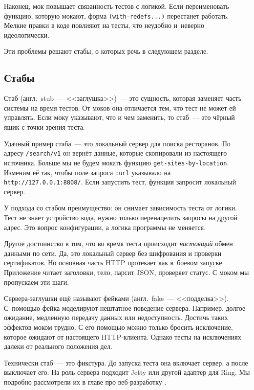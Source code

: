 Наконец, мок повышает связанность тестов с логикой. Если переименовать функцию,
которую мокают, форма \verb|(with-redefs...)| перестанет работать. Мелкие правки
в коде повлияют на тесты, что неудобно и~неверно идеологически.

Эти проблемы решают стабы, о которых речь в следующем разделе.

\subsection{Стабы}


Стаб (англ.~stub~--- <<заглушка>>)~--- это сущность, которая заменяет часть
системы на время тестов. От моков она отличается тем, что тест не может ей
управлять. Если моку указывают, что и чем заменить, то стаб~--- это чёрный ящик с
точки зрения теста.

Удачный пример стаба~--- это локальный сервер для поиска ресторанов. По адресу
\verb|/search/v1| он вернёт данные, которые скопировали из настоящего
источника. Больше мы не будем мокать функцию \verb|get-sites-by-location|.
Изменим её так, чтобы поле запроса \verb|:url| указывало на \verb|http://127.0.0.1:8808/|.
Если запустить тест, функция запросит локальный сервер.

У подхода со стабом преимущество: он снимает зависимость теста от логики. Тест
не знает устройство кода, нужно только перенацелить запросы на другой адрес. Это
вопрос конфигурации, а логика программы не меняется.

Другое достоинство в том, что во время теста происходит \emph{настоящий} обмен
данными по сети. Да, это локальный сервер без шифрования и проверки
сертификатов. Но основная часть HTTP протекает как в~боевом запуске. Приложение
читает заголовки, тело, парсит JSON, проверяет статус. С моком мы пропускаем эти
шаги.


Сервера-заглушки ещё называют фейками (англ.~fake~--- <<подделка>>). С~помощью фейка
моделируют нештатное поведение сервера. Например, долгое ожидание, медленную
передачу данных или недоступность. Достичь таких эффектов моком трудно. С его
помощью можно только бросить исключение, которое ожидают от настоящего
HTTP-клиента. Однако тесты на исключениях далеки от реального положения дел.

Технически стаб~--- это фикстура. До запуска теста она включает сервер, а после
выключает его. На роль сервера подходит Jetty или другой адаптер для Ring. Мы
подробно рассмотрели их в главе про веб-разработку .

